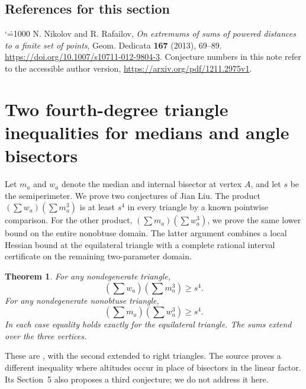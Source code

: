 \documentclass[11pt,a4paper]{article}
\makeatletter
\numberwithin{equation}{section}
\newtheorem{theorem}{Theorem}[section]
\theoremstyle{definition}
\theoremstyle{remark}
\newenvironment{sectionabstract}{\par\smallskip\begingroup\small\noindent}{\par\endgroup\medskip}
\renewenvironment{thebibliography}[1]
 {\subsection*{References for this section}\small
  \list{\@biblabel{\@arabic\c@enumiv}}
       {\settowidth\labelwidth{\@biblabel{#1}}\leftmargin\labelwidth
        \advance\leftmargin\labelsep\@openbib@code
        \usecounter{enumiv}\let\p@enumiv\@empty
        \renewcommand\theenumiv{\@arabic\c@enumiv}}
  \sloppy\clubpenalty4000\widowpenalty4000\sfcode`\.=1000\relax}
 {\def\@noitemerr{\@latex@warning{Empty bibliography}}\endlist}
\makeatother
\begin{document}
\begin{thebibliography}{9}
 N. Nikolov and R. Rafailov, \emph{On extremums of sums of powered distances to a finite set of points}, Geom. Dedicata \textbf{167} (2013), 69--89. \url{https://doi.org/10.1007/s10711-012-9804-3}. Conjecture numbers in this note refer to the accessible author version, \url{https://arxiv.org/pdf/1211.2975v1}.
\end{thebibliography}

\par\endgroup

\begingroup

\section{\texorpdfstring{Two fourth-degree triangle inequalities for medians and angle bisectors}{Two fourth-degree triangle inequalities for medians and angle bisectors}}\label{section:r34meiji}
\par\medskip


\begin{sectionabstract}
Let $m_a$ and $w_a$ denote the median and internal bisector at vertex $A$, and let $s$ be the semiperimeter. We prove two conjectures of Jian Liu. The product $(\sum w_a)(\sum m_a^3)$ is at least $s^4$ in every triangle by a known pointwise comparison. For the other product, $(\sum m_a)(\sum w_a^3)$, we prove the same lower bound on the entire nonobtuse domain. The latter argument combines a local Hessian bound at the equilateral triangle with a complete rational interval certificate on the remaining two-parameter domain.
\end{sectionabstract}

\begin{theorem}
For any nondegenerate triangle,
\begin{equation}\label{r34meiji:eq1}
 \left(\sum w_a\right)\left(\sum m_a^3\right)\ge s^4 .
\end{equation}
For any nondegenerate nonobtuse triangle,
\begin{equation}\label{r34meiji:eq2}
 \left(\sum m_a\right)\left(\sum w_a^3\right)\ge s^4 .
\end{equation}
In each case equality holds exactly for the equilateral triangle. The sums extend over the three vertices.
\end{theorem}
These are \cite[p.~78, Conjectures 5.1 and 5.2]{r34meiji:liu}, with the second extended to right triangles. The source proves a different inequality where altitudes occur in place of bisectors in the linear factor. Its Section~5 also proposes a third conjecture; we do not address it here.
\end{document}
